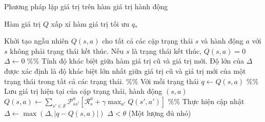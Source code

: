 \begin{algorithm}
	\caption{Phương pháp lặp giá trị trên hàm giá trị hành động}
	\label{alg_qval_iteration}
	\begin{algorithmic}[1]
		\renewcommand{\algorithmicrequire}{\textbf{Đầu vào:}}
		\renewcommand{\algorithmicensure}{\textbf{Đầu ra:}}
		\algnewcommand{}
		\algnewcommand\Operation{\item[\algorithmicoperation]}
		
		\Require
		\Ensure Hàm giá trị $Q$ xấp xỉ hàm giá trị tối ưu $q_{*}$
		
		\Operation
		\State Khởi tạo ngẫu nhiên $Q(s,a)$ cho tất cả các cặp trạng thái $s$ và hành động $a$ với $s$ không phải trạng thái kết thúc. Nếu $s$ là trạng thái kết thúc, $Q(s,a) = 0$
		\Repeat
		\State $\Delta \leftarrow 0$ \%\% Tính độ khác biệt giữa hàm giá trị cũ và giá trị mới. Độ lớn của $\Delta$ được xác định là độ khác biệt lớn nhất giữa giá trị cũ và giá trị mới của một trạng thái trong tất cả các trạng thái.
		 \%\% Với mỗi trạng thái
		\State $q \leftarrow Q(s,a)$ \%\% Lưu giá trị hiện tại của cặp trạng thái, hành động $(s,a)$
		\State $Q(s,a) \leftarrow \sum_{s' \in \mathcal{S}}\mathcal{P}_{ss'}^{a}\left[\mathcal{R}_{s}^{a} + \gamma \max_{a'}Q(s',a')\right]$ \%\% Thực hiện cập nhật
		\State $\Delta \leftarrow \max(\Delta,|q - Q(s,a)|)$
		\EndFor
		\Until $\Delta < \theta$ (Một lượng đủ nhỏ)
	\end{algorithmic}
\end{algorithm}


